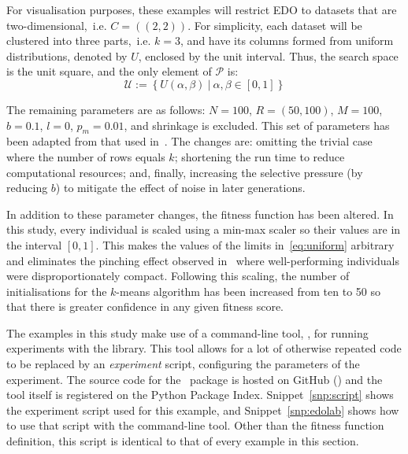 
For visualisation purposes, these examples will restrict EDO to datasets that
are two-dimensional,~i.e. \(C = ((2, 2))\). For simplicity, each dataset
will be clustered into three parts,~i.e. \(k = 3\), and have its columns formed
from uniform distributions, denoted by \(U\), enclosed by the unit interval.
Thus, the search space is the unit square, and the only element of
\(\mathcal{P}\) is:
\begin{equation}\label{eq:uniform}
    \mathcal{U} := \left\{U(\alpha, \beta)~|~\alpha, \beta \in [0, 1]\right\}
\end{equation}

The remaining parameters are as follows: \(N=100\), \(R=(50,100)\), \(M=100\),
\(b=0.1\), \(l=0\), \(p_m=0.01\), and shrinkage is excluded. This set of
parameters has been adapted from that used in~\cite{Wilde2020:edo}. The changes
are: omitting the trivial case where the number of rows equals \(k\); shortening
the run time to reduce computational resources; and, finally, increasing the
selective pressure (by reducing \(b\)) to mitigate the effect of noise in later
generations.

In addition to these parameter changes, the fitness function has been altered.
In this study, every individual is scaled using a min-max scaler so their values
are in the interval \(\left[0, 1\right]\). This makes the values of the limits
in~\eqref{eq:uniform} arbitrary and eliminates the pinching effect observed
in~\cite{Wilde2020:edo} where well-performing individuals were
disproportionately compact. Following this scaling, the number of
initialisations for the \(k\)-means algorithm has been increased from ten to 50
so that there is greater confidence in any given fitness score.

The examples in this study make use of a command-line tool, \edolab, for running
experiments with the library. This tool allows for a lot of otherwise repeated
code to be replaced by an \emph{experiment} script, configuring the parameters
of the experiment. The source code for the \edolab\ package is hosted on GitHub
() and the tool itself is registered on the Python
Package Index. Snippet~\ref{snp:script} shows the experiment script used for
this example, and Snippet~\ref{snp:edolab} shows how to use that script with the
command-line tool. Other than the fitness function definition, this script is
identical to that of every example in this section.


